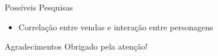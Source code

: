 \documentclass{beamer}
\begin{document}
\begin{frame}{Possíveis Pesquisas}
\begin{itemize}
    \item Correlação entre vendas e interação entre personagens
\end{itemize}
\end{frame}

\begin{frame}{Agradecimentos}
\centering
Obrigado pela atenção!
\end{frame}
\end{document}
